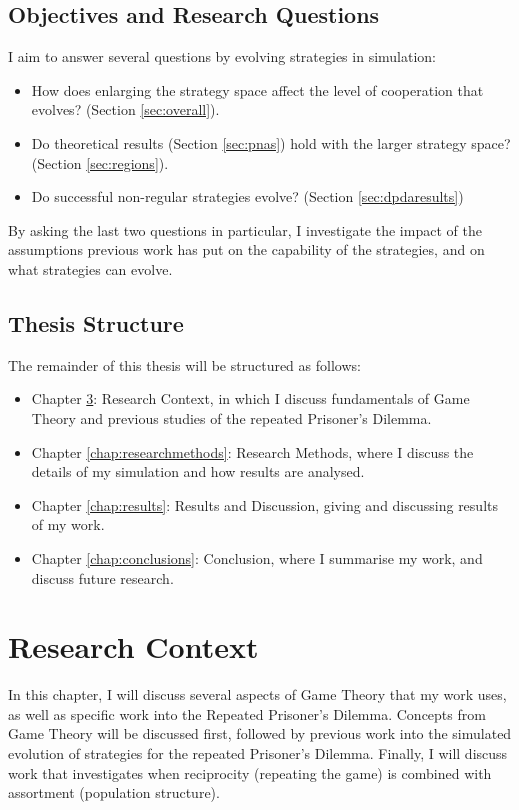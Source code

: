 \documentclass[a4paper,11pt,bcshonoursthesis,singlespace,oneside,thesisdraft,pdflatex]{cssethesis}
\begin{document}
\section{Objectives and Research Questions}
I aim to answer several questions by evolving strategies in simulation:
\begin{itemize}
\item How does enlarging the strategy space affect the level of cooperation that evolves? (Section \ref{sec:overall}). 
\item Do theoretical results (Section \ref{sec:pnas}) hold with the larger strategy space? (Section \ref{sec:regions}).
\item Do successful non-regular strategies evolve? (Section \ref{sec:dpdaresults})
\end{itemize}
 
By asking the last two questions in particular, I investigate the impact of the assumptions previous work has put on the capability of the strategies, and on what strategies can evolve. 

\section{Thesis Structure}
The remainder of this thesis will be structured as follows:
\begin{itemize}
\item Chapter \ref{chap:researchcontext}: Research Context, in which I discuss fundamentals of Game Theory and previous studies of the repeated Prisoner's Dilemma.
\item Chapter \ref{chap:researchmethods}: Research Methods, where I discuss the details of my simulation and how results are analysed.
\item Chapter \ref{chap:results}: Results and Discussion, giving and discussing results of my work.
\item Chapter \ref{chap:conclusions}: Conclusion, where I summarise my work, and discuss future research.
\end{itemize}

\chapter{Research Context}
\label{chap:researchcontext}
In this chapter, I will discuss several aspects of Game Theory that my work uses, as well as specific work into the Repeated Prisoner's Dilemma. 
Concepts from Game Theory will be discussed first, followed by previous work into the simulated evolution of strategies for the repeated Prisoner's Dilemma. 
Finally, I will discuss work that investigates when reciprocity (repeating the game) is combined with assortment (population structure).
\end{document}
